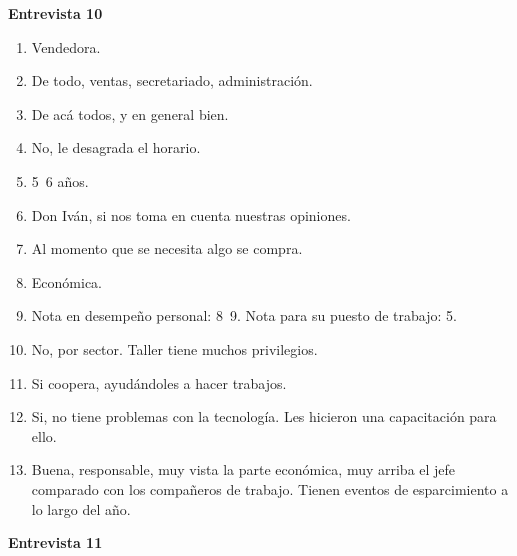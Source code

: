 \newpage
\textbf{Entrevista 10}\\
\begin{enumerate}
	\item Vendedora.
	\item De todo, ventas, secretariado, administración.
	\item De acá todos, y en general bien.
	\item No, le desagrada el horario.
	\item 5~6 años.
	\item Don Iván, si nos toma en cuenta nuestras opiniones.
	\item Al momento que se necesita algo se compra.
	\item Económica.
	\item Nota en desempeño personal: 8~9. Nota para su puesto de trabajo: 5.
	\item No, por sector. Taller tiene muchos privilegios.
	\item Si coopera, ayudándoles a hacer trabajos.
	\item Si, no tiene problemas con la tecnología. Les hicieron una capacitación para ello.
	\item Buena, responsable, muy vista la parte económica, muy arriba el jefe comparado con los compañeros de trabajo. Tienen eventos de esparcimiento a lo largo del año.
\end{enumerate}
\newpage
\textbf{Entrevista 11}\\
